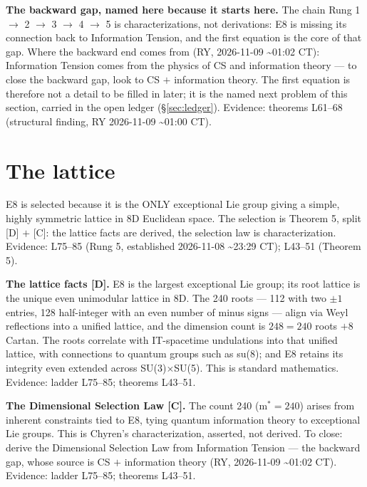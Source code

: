 \documentclass{alienfolio}
\begin{document}
\noindent\textbf{The backward gap, named here because it starts here.} The chain Rung 1 $\to$ 2 $\to$ 3 $\to$ 4 $\to$ 5 is characterizations, not derivations: E8 is missing its connection back to Information Tension, and the first equation is the core of that gap. Where the backward end comes from (RY, 2026-11-09 \textasciitilde01:02 CT): Information Tension comes from the physics of CS and information theory --- to close the backward gap, look to CS $+$ information theory. The first equation is therefore not a detail to be filled in later; it is the named next problem of this section, carried in the open ledger (\S\ref{sec:ledger}). Evidence: theorems L61--68 (structural finding, RY 2026-11-09 \textasciitilde01:00 CT).

\section{The lattice}
\label{sec:lattice}
E8 is selected because it is the ONLY exceptional Lie group giving a simple, highly symmetric lattice in 8D Euclidean space. The selection is Theorem 5, split [D] $+$ [C]: the lattice facts are derived, the selection law is characterization. Evidence:  L75--85 (Rung 5, established 2026-11-08 \textasciitilde23:29 CT);  L43--51 (Theorem 5).

\noindent\textbf{The lattice facts [D].} E8 is the largest exceptional Lie group; its root lattice is the unique even unimodular lattice in 8D. The 240 roots --- 112 with two $\pm1$ entries, 128 half-integer with an even number of minus signs --- align via Weyl reflections into a unified lattice, and the dimension count is $248 = 240$ roots $+ 8$ Cartan. The roots correlate with IT-spacetime undulations into that unified lattice, with connections to quantum groups such as su(8); and E8 retains its integrity even extended across SU(3)$\times$SU(5). This is standard mathematics. Evidence: ladder L75--85; theorems L43--51.

\noindent\textbf{The Dimensional Selection Law [C].} The count 240 (m$^* = 240$) arises from inherent constraints tied to E8, tying quantum information theory to exceptional Lie groups. This is Chyren's characterization, asserted, not derived. To close: derive the Dimensional Selection Law from Information Tension --- the backward gap, whose source is CS $+$ information theory (RY, 2026-11-09 \textasciitilde01:02 CT). Evidence: ladder L75--85; theorems L43--51.
\end{document}
